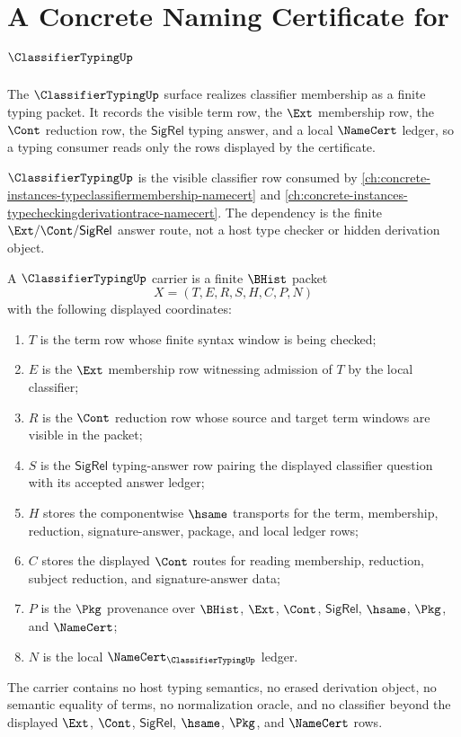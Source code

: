 \chapter{A Concrete Naming Certificate for $\ClassifierTypingUp$}
\label{ch:concrete-instances-classifiertyping-namecert}

The $\ClassifierTypingUp$ surface realizes classifier membership as a finite typing packet. It records the visible term row, the $\Ext$ membership row, the $\Cont$ reduction row, the $\mathsf{SigRel}$ typing answer, and a local $\NameCert$ ledger, so a typing consumer reads only the rows displayed by the certificate.

$\ClassifierTypingUp$ is the visible classifier row consumed by \autoref{ch:concrete-instances-typeclassifiermembership-namecert} and \autoref{ch:concrete-instances-typecheckingderivationtrace-namecert}. The dependency is the finite $\Ext/\Cont/\mathsf{SigRel}$ answer route, not a host type checker or hidden derivation object.

\begin{definition}
\label{def:classifier-typing-carrier}
A $\ClassifierTypingUp$ carrier is a finite $\BHist$ packet
$$
X=(T,E,R,S,H,C,P,N)
$$
with the following displayed coordinates:
\begin{enumerate}
\item $T$ is the term row whose finite syntax window is being checked;
\item $E$ is the $\Ext$ membership row witnessing admission of $T$ by the local classifier;
\item $R$ is the $\Cont$ reduction row whose source and target term windows are visible in the packet;
\item $S$ is the $\mathsf{SigRel}$ typing-answer row pairing the displayed classifier question with its accepted answer ledger;
\item $H$ stores the componentwise $\hsame$ transports for the term, membership, reduction, signature-answer, package, and local ledger rows;
\item $C$ stores the displayed $\Cont$ routes for reading membership, reduction, subject reduction, and signature-answer data;
\item $P$ is the $\Pkg$ provenance over $\BHist$, $\Ext$, $\Cont$, $\mathsf{SigRel}$, $\hsame$, $\Pkg$, and $\NameCert$;
\item $N$ is the local $\NameCert_{\ClassifierTypingUp}$ ledger.
\end{enumerate}
The carrier contains no host typing semantics, no erased derivation object, no semantic equality of terms, no normalization oracle, and no classifier beyond the displayed $\Ext$, $\Cont$, $\mathsf{SigRel}$, $\hsame$, $\Pkg$, and $\NameCert$ rows.
\end{definition}


